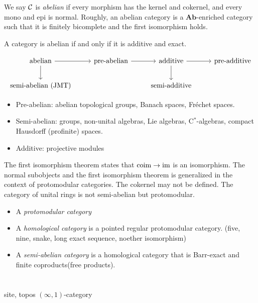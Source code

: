\documentclass{../../large}
\newcommand{\Ab}{\mathbf{Ab}}
\newcommand{\coim}{\operatorname{coim}}
\begin{document}
\begin{prb}
We say $\mathcal{C}$ is \emph{abelian} if every morphism has the kernel and cokernel, and every mono and epi is normal.
Roughly, an abelian category is a $\Ab$-enriched category such that it is finitely bicomplete and the first isomorphism holds.
\begin{parts}
\item A category is abelian if and only if it is additive and exact.
\end{parts}
\end{prb}


\begin{prb}
\end{prb}


\[\begin{tikzcd}[math mode=false]
abelian\ar{r}\ar{d} & pre-abelian \ar{r} & additive \ar{r}\ar{d} & pre-additive\\
semi-abelian (JMT) && semi-additive & \,
\end{tikzcd}\]
\begin{itemize}
\item Pre-abelian: abelian topological groups, Banach spaces, Fr\'echet spaces.
\item Semi-abelian: groups, non-unital algebras, Lie algebras, C$^*$-algebras, compact Hausdorff (profinite) spaces.
\item Additive: projective modules
\end{itemize}





The first isomorphism theorem states that $\coim\to\im$ is an isomorphism.
The normal subobjects and the first isomorphism theorem is generalized in the context of protomodular categories.
The cokernel may not be defined.
The category of unital rings is not semi-abelian but protomodular.
\begin{itemize}
\item A \emph{protomodular category}
\item A \emph{homological category} is a pointed regular protomodular category. (five, nine, snake, long exact sequence, noether isomorphism)
\item A \emph{semi-abelian category} is a homological category that is Barr-exact and finite coproducts(free products).
\end{itemize}




\chapter{}
site, topos
$(\infty,1)$-category
\end{document}
